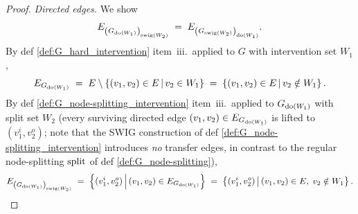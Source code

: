 \documentclass[main]{subfiles}
\begin{document}
\begin{proof}
\medskip\noindent\emph{Directed edges.}
We show
\[ E_{\left ( G_{\operatorname{do}(W_1)} \right )_{\mathrm{swig}(W_2)}} \;=\; E_{\left ( G_{\mathrm{swig}(W_2)} \right )_{\operatorname{do}(W_1)}}. \]
By def \ref{def:G_hard_intervention} item~iii.\ applied to $G$ with intervention set $W_1$,
\[
    E_{G_{\operatorname{do}(W_1)}}
    \;=\; E \setminus \left \{ (v_1, v_2) \in E \,\middle|\, v_2 \in W_1 \right \}
    \;=\; \left \{ (v_1, v_2) \in E \,\middle|\, v_2 \notin W_1 \right \}.
\]
By def \ref{def:G_node-splitting_intervention} item~iii.\ applied to $G_{\operatorname{do}(W_1)}$ with split set $W_2$ (every surviving directed edge $(v_1, v_2) \in E_{G_{\operatorname{do}(W_1)}}$ is lifted to $(v_1^i, v_2^o)$; note that the SWIG construction of def \ref{def:G_node-splitting_intervention} introduces \emph{no} transfer edges, in contrast to the regular node-splitting $\mathrm{split}$ of def \ref{def:G_node-splitting}),
\[
    E_{\left ( G_{\operatorname{do}(W_1)} \right )_{\mathrm{swig}(W_2)}}
    \;=\; \left \{ (v_1^i, v_2^o) \,\middle|\, (v_1, v_2) \in E_{G_{\operatorname{do}(W_1)}} \right \}
    \;=\; \left \{ (v_1^i, v_2^o) \,\middle|\, (v_1, v_2) \in E,\; v_2 \notin W_1 \right \}.
\]


\end{proof}
\end{document}
